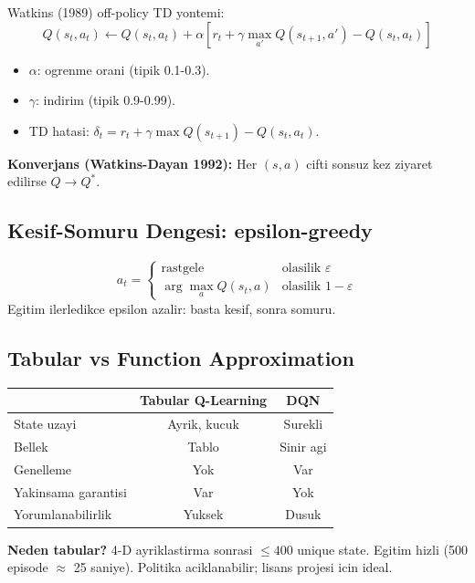 \documentclass[11pt,a4paper]{article}
\begin{document}
Watkins (1989) off-policy TD yontemi:
\[
\boxed{\;Q(s_t, a_t) \leftarrow Q(s_t, a_t) + \alpha[r_t + \gamma \max_{a'} Q(s_{t+1}, a') - Q(s_t, a_t)]\;}
\]

\begin{itemize}
  \item $\alpha$: ogrenme orani (tipik 0.1-0.3).
  \item $\gamma$: indirim (tipik 0.9-0.99).
  \item TD hatasi: $\delta_t = r_t + \gamma \max Q(s_{t+1}) - Q(s_t, a_t)$.
\end{itemize}

\textbf{Konverjans (Watkins-Dayan 1992):} Her $(s,a)$ cifti sonsuz kez ziyaret edilirse $Q \to Q^*$.

\subsection{Kesif-Somuru Dengesi: epsilon-greedy}

\[
a_t = \begin{cases}
\text{rastgele} & \text{olasilik } \varepsilon \\
\arg\max_a Q(s_t, a) & \text{olasilik } 1-\varepsilon
\end{cases}
\]
Egitim ilerledikce epsilon azalir: basta kesif, sonra somuru.

\subsection{Tabular vs Function Approximation}

\begin{center}
\begin{tabular}{lcc}
\toprule
 & Tabular Q-Learning & DQN \\
\midrule
State uzayi & Ayrik, kucuk & Surekli \\
Bellek & Tablo & Sinir agi \\
Genelleme & Yok & Var \\
Yakinsama garantisi & Var & Yok \\
Yorumlanabilirlik & Yuksek & Dusuk \\
\bottomrule
\end{tabular}
\end{center}

\begin{whybox}
\textbf{Neden tabular?} 4-D ayriklastirma sonrasi $\leq 400$ unique state. Egitim hizli (500 episode $\approx$ 25 saniye). Politika aciklanabilir; lisans projesi icin ideal.
\end{whybox}
\end{document}
